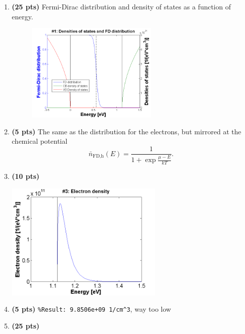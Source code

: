 \documentclass[11pt]{article}
\begin{document}
\begin{enumerate}[resume]
\item \textbf{(25 pts)} Fermi-Dirac distribution and density of states as a function of energy.\\
\begin{figure}[h]
\includegraphics[width=0.6\textwidth]{F1.png}
\end{figure}

\item \label{itm:occhole} \textbf{(5 pts)} The same as the distribution for the electrons, but mirrored at the chemical potential
$$ \bar {n}_\text{FD,h}(E)=\frac{1}{1+\exp{\frac{\mu-E}{k T}}}.$$ 

\item \label{itm:aa}\textbf{(10 pts)} 

\includegraphics[width=0.6\textwidth]{F3.png}


\item \textbf{(5 pts)} \verb|%Result: 9.8506e+09 1/cm^3|, way too low

\item \label{itm:tempdep}\textbf{(25 pts)} 


\end{enumerate}
\end{document}
